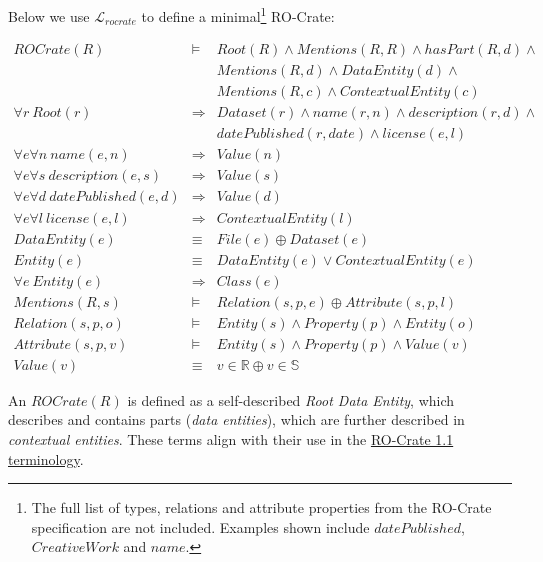 Below we use $\mathcal{L}_{rocrate}$ to define a minimal\footnote{
    The full list of types, relations and attribute properties from the RO-Crate specification are not included. Examples shown include $datePublished$, $CreativeWork$ and $name$.
} RO-Crate:


\begin{eqnarray*}
ROCrate(R)                                  & \models & Root(R) \land Mentions(R, R) \land hasPart(R, d) \land \\
                                            & & Mentions(R, d) \land DataEntity(d) \land \\
                                            & & Mentions(R, c) \land ContextualEntity(c) \\
\forall r \ Root(r)                         & \Rightarrow & Dataset(r) \land name(r, n) \land description(r, d) \land \\
                                            & &             datePublished(r, date) \land license(e, l) \\
\forall e \forall n \ name(e, n)            & \Rightarrow & Value(n) \\
\forall e \forall s \ description(e, s)     & \Rightarrow & Value(s) \\
\forall e \forall d \ datePublished(e, d)   & \Rightarrow & Value(d) \\
\forall e \forall l \ license(e, l)         & \Rightarrow & ContextualEntity(l) \\
DataEntity(e)                               & \equiv &      File(e) \oplus Dataset(e) \\
Entity(e)                                   & \equiv &      DataEntity(e) \lor ContextualEntity(e) \\
\forall e \ Entity(e)                       & \Rightarrow & Class(e) \\
Mentions(R, s)                              & \models &     Relation(s, p, e) \oplus Attribute(s,  p, l) \\
Relation(s, p, o)                           & \models &     Entity(s) \land Property(p) \land  Entity(o) \\
Attribute(s, p, v)                          & \models &     Entity(s) \land Property(p) \land Value(v) \\
Value(v)                                    & \equiv &      v \in \mathbb{R} \oplus v \in \mathbb{S}
\end{eqnarray*}

An $ROCrate(R)$ is defined as a self-described \emph{Root Data Entity}, which describes and contains parts (\emph{data entities}), which are further described in \emph{contextual entities}.  These terms align with their use in the \href{https://www.researchobject.org/ro-crate/1.1/terminology}{RO-Crate 1.1 terminology}.

